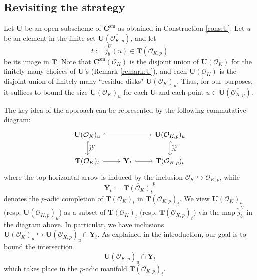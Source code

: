 \documentclass[11pt,oneside]{amsart}
\theoremstyle{plain}
\theoremstyle{definition}
\def\lra{{\longrightarrow}}
\DeclareMathOperator{\sm}{sm}
\def\TT{\mathbf{T}}
\def\CC{\mathbf{C}}
\def\U{\mathbf{U}}
\def\Y{\mathbf{Y}}
\def\oh{\mathcal{O}}
\begin{document}
\subsection{Revisiting the strategy}
Let $\U$ be an open subscheme of $\CC^{\sm}$ as obtained in Construction \ref{cons:U}. Let $u$ be an element in the finite set $\U(\overline{\oh_{K, p}})$, and let
$$t:=\tilde{j}_b^{U}(u)\in \TT(\overline{\oh_{K, p}})$$ 
be its image in $\TT$. Note that $\CC^{\sm}(\oh_K)$ is the disjoint union of $\U(\oh_K)$ for the finitely many choices of $\U$'s (Remark \ref{remark:U}), and each $\U(\oh_K)$ is the disjoint union of finitely many ``residue disks" $\U(\oh_K)_u$. Thus, for our purposes, it suffices to bound the size $\U(\oh_K)_u$ for each $\U$ and each point $u \in \U(\overline{\oh_{K, p}})$.  


The key idea of the approach can be represented by the following commutative diagram:
\begin{equation}\label{diag:chab}
\begin{tikzcd}[row sep = 2em]
   \U(\oh_K)_u \arrow[hook]{d}{\tilde{j}_b^U}  
   \arrow[hook]{rr}
&&       \U(\oh_{K, p})_u \arrow[hook]{d}{\tilde{j}_b^U} 
 \\
   \TT(\oh_K)_t \arrow[hook]{r} 
    &  \Y_t \arrow[hook]{r} 
    & \TT(\oh_{K, p})_t
\end{tikzcd}
\end{equation}
where the top horizontal arrow is induced by the inclusion $\oh_K \hookrightarrow \oh_{K, p}$, while 
$$\Y_t := \overline{\TT(\oh_K)_t}^p$$ denotes the $p$-adic completion of $\TT(\oh_K)_t$ in $\TT(\oh_{K, p})_t$. We view $\U(\oh_K)_u$ (resp. $\U(\oh_{K, p})_u$) as a subset of $\TT(\oh_K)_t$ (resp. $\TT(\oh_{K, p})_t$) via the map $\tilde{j}_b^U$ in the diagram above. In particular, we have inclusions
$\U(\oh_K)_u \hookrightarrow   \U(\oh_{K, p})_u \cap \Y_t. $
As explained in the introduction,  our goal is to bound the intersection 
    \begin{equation}\label{intersection}
     \U(\oh_{K, p})_u \cap \Y_t
    \end{equation}
    which takes place in the $p$-adic manifold $\TT(\oh_{K, p})_t$. 
 
\end{document}
